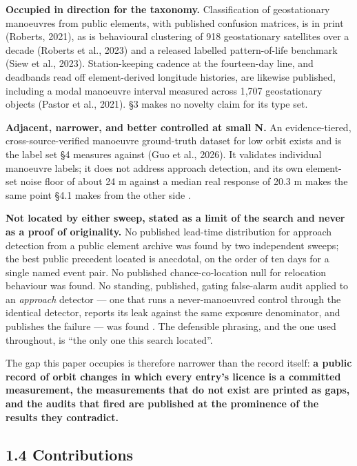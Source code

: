 \documentclass[11pt]{article}
\begin{document}
\textbf{Occupied in direction for the taxonomy.} Classification of geostationary manoeuvres from public elements, with published confusion matrices, is in print (Roberts, 2021), as is behavioural clustering of 918 geostationary satellites over a decade (Roberts et al., 2023) and a released labelled pattern-of-life benchmark (Siew et al., 2023). Station-keeping cadence at the fourteen-day line, and deadbands read off element-derived longitude histories, are likewise published, including a modal manoeuvre interval measured across 1,707 geostationary objects (Pastor et al., 2021). \S{}3 makes no novelty claim for its type set.

\textbf{Adjacent, narrower, and better controlled at small N.} An evidence-tiered, cross-source-verified manoeuvre ground-truth dataset for low orbit exists and is the label set \S{}4 measures against (Guo et al., 2026). It validates individual manoeuvre labels; it does not address approach detection, and its own element-set noise floor of about 24 m against a median real response of 20.3 m makes the same point \S{}4.1 makes from the other side%
.

\textbf{Not located by either sweep, stated as a limit of the search and never as a proof of originality.} No published lead-time distribution for approach detection from a public element archive was found by two independent sweeps; the best public precedent located is anecdotal, on the order of ten days for a single named event pair. No published chance-co-location null for relocation behaviour was found. No standing, published, gating false-alarm audit applied to an \emph{approach} detector --- one that runs a never-manoeuvred control through the identical detector, reports its leak against the same exposure denominator, and publishes the failure --- was found%
. The defensible phrasing, and the one used throughout, is ``the only one this search located''.

The gap this paper occupies is therefore narrower than the record itself: \textbf{a public record of orbit changes in which every entry's licence is a committed measurement, the measurements that do not exist are printed as gaps, and the audits that fired are published at the prominence of the results they contradict.}

\subsection*{1.4 Contributions}
\end{document}
